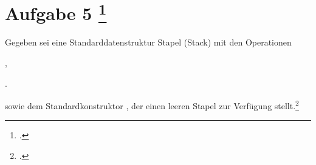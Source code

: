 \documentclass{lehramt-informatik-aufgabe}
\begin{document}

\section{Aufgabe 5
\footcite[Herbst 2014 (66115) - Thema 2 Aufgabe 5, Seite 5]{examen:66115:2014:09}}

Gegeben sei eine Standarddatenstruktur Stapel (Stack) mit den
Operationen

\bigskip

\begin{compactitem}
\item {}
\item {},
\item {}.
\end{compactitem}

\bigskip

\noindent
sowie dem Standardkonstruktor , der einen leeren Stapel
zur Verfügung stellt.\footcite[Seite 2-3, Aufgabe 5]{aud:ab:4}
\end{document}
